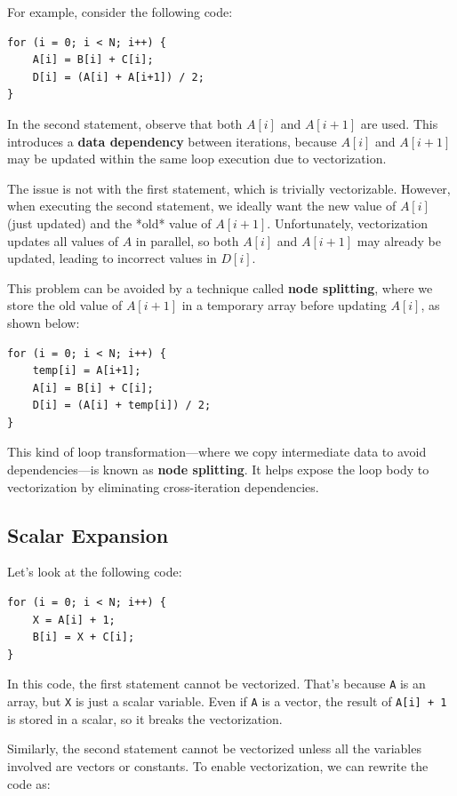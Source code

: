 \documentclass[12pt]{book}
\begin{document}
For example, consider the following code:
\begin{lstlisting}[style=cppstyle]
for (i = 0; i < N; i++) {
    A[i] = B[i] + C[i];
    D[i] = (A[i] + A[i+1]) / 2;
}
\end{lstlisting}

In the second statement, observe that both \( A[i] \) and \( A[i+1] \) are used. This introduces a \textbf{data dependency} between iterations, because \( A[i] \) and \( A[i+1] \) may be updated within the same loop execution due to vectorization. 

The issue is not with the first statement, which is trivially vectorizable. However, when executing the second statement, we ideally want the new value of \( A[i] \) (just updated) and the *old* value of \( A[i+1] \). Unfortunately, vectorization updates all values of \( A \) in parallel, so both \( A[i] \) and \( A[i+1] \) may already be updated, leading to incorrect values in \( D[i] \).

This problem can be avoided by a technique called \textbf{node splitting}, where we store the old value of \( A[i+1] \) in a temporary array before updating \( A[i] \), as shown below:

\begin{lstlisting}[style=cppstyle]
for (i = 0; i < N; i++) {
    temp[i] = A[i+1];
    A[i] = B[i] + C[i];
    D[i] = (A[i] + temp[i]) / 2;
}
\end{lstlisting}

This kind of loop transformation—where we copy intermediate data to avoid dependencies—is known as \textbf{node splitting}. It helps expose the loop body to vectorization by eliminating cross-iteration dependencies.

\subsection{Scalar Expansion}
Let’s look at the following code:
\begin{lstlisting}[style=cppstyle]
for (i = 0; i < N; i++) {
    X = A[i] + 1;
    B[i] = X + C[i];
}
\end{lstlisting}

In this code, the first statement cannot be vectorized. That’s because \texttt{A} is an array, but \texttt{X} is just a scalar variable. Even if \texttt{A} is a vector, the result of \texttt{A[i] + 1} is stored in a scalar, so it breaks the vectorization.

Similarly, the second statement cannot be vectorized unless all the variables involved are vectors or constants. To enable vectorization, we can rewrite the code as:
\end{document}
